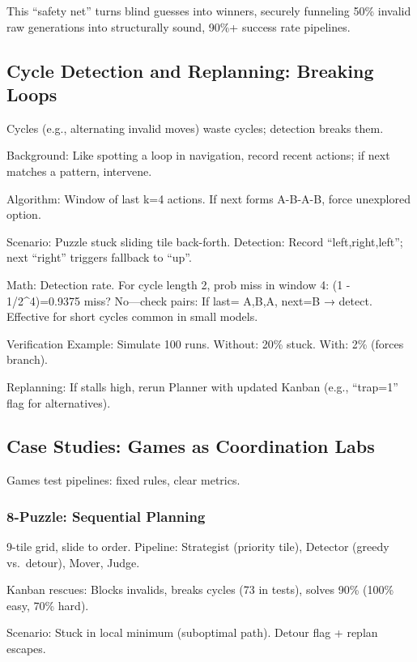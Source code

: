 \documentclass[
]{article}
\begin{document}
This ``safety net'' turns blind guesses into winners, securely funneling
50\% invalid raw generations into structurally sound, 90\%+ success rate
pipelines.

\subsection{Cycle Detection and Replanning: Breaking
Loops}\label{cycle-detection-and-replanning-breaking-loops}

Cycles (e.g., alternating invalid moves) waste cycles; detection breaks
them.

Background: Like spotting a loop in navigation, record recent actions;
if next matches a pattern, intervene.

Algorithm: Window of last k=4 actions. If next forms A-B-A-B, force
unexplored option.

Scenario: Puzzle stuck sliding tile back-forth. Detection: Record
``left,right,left''; next ``right'' triggers fallback to ``up''.

Math: Detection rate. For cycle length 2, prob miss in window 4: (1 -
1/2\^{}4)=0.9375 miss? No---check pairs: If last= A,B,A, next=B →
detect. Effective for short cycles common in small models.

Verification Example: Simulate 100 runs. Without: 20\% stuck. With: 2\%
(forces branch).

Replanning: If stalls high, rerun Planner with updated Kanban (e.g.,
``trap=1'' flag for alternatives).

\subsection{Case Studies: Games as Coordination
Labs}\label{case-studies-games-as-coordination-labs}

Games test pipelines: fixed rules, clear metrics.

\subsubsection{8-Puzzle: Sequential
Planning}\label{puzzle-sequential-planning}

9-tile grid, slide to order. Pipeline: Strategist (priority tile),
Detector (greedy vs.~detour), Mover, Judge.

Kanban rescues: Blocks invalids, breaks cycles (73 in tests), solves
90\% (100\% easy, 70\% hard).

Scenario: Stuck in local minimum (suboptimal path). Detour flag + replan
escapes.
\end{document}
